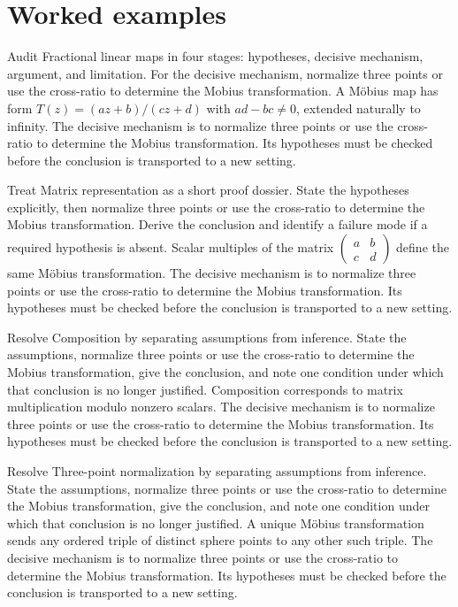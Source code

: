 \section{Worked examples}

\begin{example}\label{ex:iv16-worked-01}
Audit Fractional linear maps in four stages: hypotheses, decisive mechanism, argument, and limitation. For the decisive mechanism, normalize three points or use the cross-ratio to determine the Mobius transformation. A Möbius map has form $T(z)=(az+b)/(cz+d)$ with $ad-bc\ne0$, extended naturally to infinity. The decisive mechanism is to normalize three points or use the cross-ratio to determine the Mobius transformation. Its hypotheses must be checked before the conclusion is transported to a new setting.
\end{example}

\begin{example}\label{ex:iv16-worked-02}
Treat Matrix representation as a short proof dossier. State the hypotheses explicitly, then normalize three points or use the cross-ratio to determine the Mobius transformation. Derive the conclusion and identify a failure mode if a required hypothesis is absent. Scalar multiples of the matrix $\begin{pmatrix}a&b\\c&d\end{pmatrix}$ define the same Möbius transformation. The decisive mechanism is to normalize three points or use the cross-ratio to determine the Mobius transformation. Its hypotheses must be checked before the conclusion is transported to a new setting.
\end{example}

\begin{example}\label{ex:iv16-worked-03}
Resolve Composition by separating assumptions from inference. State the assumptions, normalize three points or use the cross-ratio to determine the Mobius transformation, give the conclusion, and note one condition under which that conclusion is no longer justified. Composition corresponds to matrix multiplication modulo nonzero scalars. The decisive mechanism is to normalize three points or use the cross-ratio to determine the Mobius transformation. Its hypotheses must be checked before the conclusion is transported to a new setting.
\end{example}

\begin{example}\label{ex:iv16-worked-04}
Resolve Three-point normalization by separating assumptions from inference. State the assumptions, normalize three points or use the cross-ratio to determine the Mobius transformation, give the conclusion, and note one condition under which that conclusion is no longer justified. A unique Möbius transformation sends any ordered triple of distinct sphere points to any other such triple. The decisive mechanism is to normalize three points or use the cross-ratio to determine the Mobius transformation. Its hypotheses must be checked before the conclusion is transported to a new setting.
\end{example}

